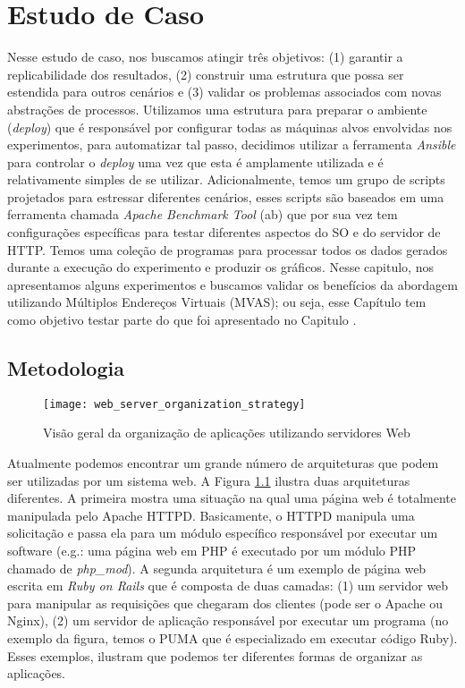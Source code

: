 \chapter{Estudo de Caso}
\label{cap:estudo-de-caso}

Nesse estudo de caso, nos buscamos atingir três objetivos: (1) garantir a
replicabilidade dos resultados, (2) construir uma estrutura que possa ser
estendida para outros cenários e (3) validar os problemas associados com novas
abstrações de processos. Utilizamos uma estrutura para preparar o ambiente
(\emph{deploy}) que é responsável por configurar todas as máquinas alvos
envolvidas nos experimentos, para automatizar tal passo, decidimos utilizar a
ferramenta \emph{Ansible} para controlar o \emph{deploy} uma vez que esta é
amplamente utilizada e é relativamente simples de se utilizar. Adicionalmente,
temos um grupo de scripts projetados para estressar diferentes cenários, esses
scripts são baseados em uma ferramenta chamada \emph{Apache Benchmark Tool}
(ab) que por sua vez tem configurações específicas para testar diferentes
aspectos do SO e do servidor de HTTP. Temos uma coleção de programas para
processar todos os dados gerados durante a execução do experimento e produzir
os gráficos. Nesse capitulo, nos apresentamos alguns experimentos e buscamos
validar os benefícios da abordagem utilizando Múltiplos Endereços Virtuais
(MVAS); ou seja, esse Capítulo tem como objetivo testar parte do que foi
apresentado no Capitulo \label{cap:validacoes}.

\section{Metodologia}
\label{sec:metodologia}

\begin{figure}[!h]
  \centering
  \texttt{[image: web\_server\_organization\_strategy]}
  \caption{Visão geral da organização de aplicações utilizando servidores Web}
  \label{fig:web_server}
\end{figure}

Atualmente podemos encontrar um grande número de arquiteturas que podem ser
utilizadas por um sistema web. A Figura \ref{fig:web_server} ilustra duas
arquiteturas diferentes. A primeira mostra uma situação na qual uma página web
é totalmente manipulada pelo Apache HTTPD. Basicamente, o HTTPD manipula uma
solicitação e passa ela para um módulo específico responsável por executar um
software (e.g.: uma página web em PHP é executado por um módulo PHP chamado de
\emph{php\_mod}). A segunda arquitetura é um exemplo de página web escrita em
\emph{Ruby on Rails} que é composta de duas camadas: (1) um servidor web para
manipular as requisições que chegaram dos clientes (pode ser o Apache ou
Nginx), (2) um servidor de aplicação responsável por executar um programa (no
exemplo da figura, temos o PUMA que é especializado em executar código Ruby).
Esses exemplos, ilustram que podemos ter diferentes formas de organizar as
aplicações.


